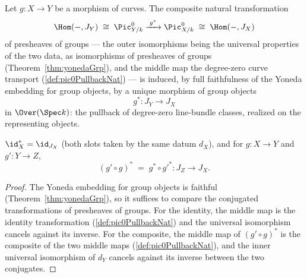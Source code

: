 \begin{definition}
  \label{def:jacobian_data_pullbackHom}
  \leanok
  Let \(g \colon X \to Y\) be a morphism of curves. The composite natural
  transformation
  \[
    \Hom(-, J_Y) \;\cong\; \Pic^0_{Y/k}
    \xrightarrow{\;g^{*}\;} \Pic^0_{X/k} \;\cong\; \Hom(-, J_X)
  \]
  of presheaves of groups --- the outer isomorphisms being the universal
  properties of the two data, as isomorphisms of presheaves of groups
  (Theorem~\ref{thm:yonedaGrp}), and the middle map the degree-zero curve
  transport (\ref{def:pic0PullbackNat}) --- is induced, by full faithfulness
  of the Yoneda embedding for group objects, by a unique morphism of group
  objects
  \[
    g^{*} \colon J_Y \longrightarrow J_X
  \]
  in \(\Over(\Spec k)\): the pullback of degree-zero line-bundle classes,
  realized on the representing objects.
\end{definition}

\begin{theorem}
  \label{thm:jacobian_data_pullbackHom_laws}
  \leanok
  \(\id_X^{*} = \id_{J_X}\) (both slots taken by the same datum \(d_X\)), and
  for \(g \colon X \to Y\) and \(g' \colon Y \to Z\),
  \[
    (g' \circ g)^{*} \;=\; g^{*} \circ g'^{*} \colon J_Z \longrightarrow J_X .
  \]
\end{theorem}
\begin{proof}
  \leanok
  The Yoneda embedding for group objects is faithful
  (Theorem~\ref{thm:yonedaGrp}), so it suffices to compare the conjugated
  transformations of presheaves of groups. For the identity, the middle map is
  the identity transformation (\ref{def:pic0PullbackNat}) and the universal
  isomorphism cancels against its inverse. For the composite, the middle map
  of \((g' \circ g)^{*}\) is the composite of the two middle maps
  (\ref{def:pic0PullbackNat}), and the inner universal isomorphism of \(d_Y\)
  cancels against its inverse between the two conjugates.
\end{proof}

